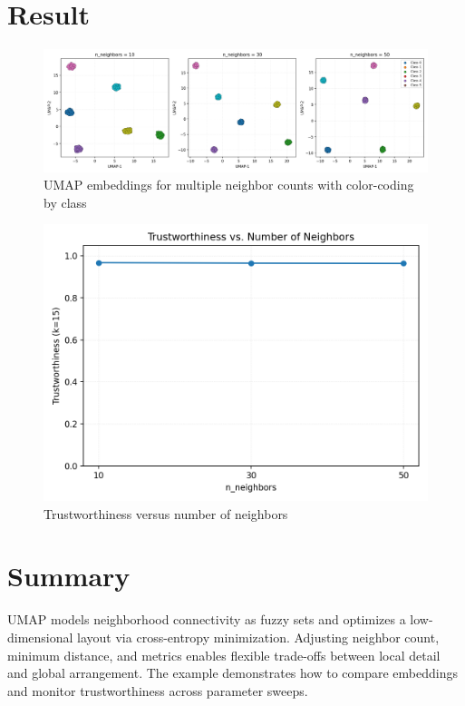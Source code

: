 ﻿\documentclass[12pt]{article}
\begin{document}
\section{Result}
\begin{figure}[H]
  \centering
  \includegraphics[width=0.82\linewidth]{umap_embeddings.png}
  \caption{UMAP embeddings for multiple neighbor counts with color-coding by class}
  \label{fig:umap_embeddings}
\end{figure}

\begin{figure}[H]
  \centering
  \includegraphics[width=0.8\linewidth]{umap_neighbor_curve.png}
  \caption{Trustworthiness versus number of neighbors}
  \label{fig:umap_neighbor_curve}
\end{figure}

\FloatBarrier
\section{Summary}
UMAP models neighborhood connectivity as fuzzy sets and optimizes a low-dimensional layout via cross-entropy minimization. Adjusting neighbor count, minimum distance, and metrics enables flexible trade-offs between local detail and global arrangement. The example demonstrates how to compare embeddings and monitor trustworthiness across parameter sweeps.
\end{document}

